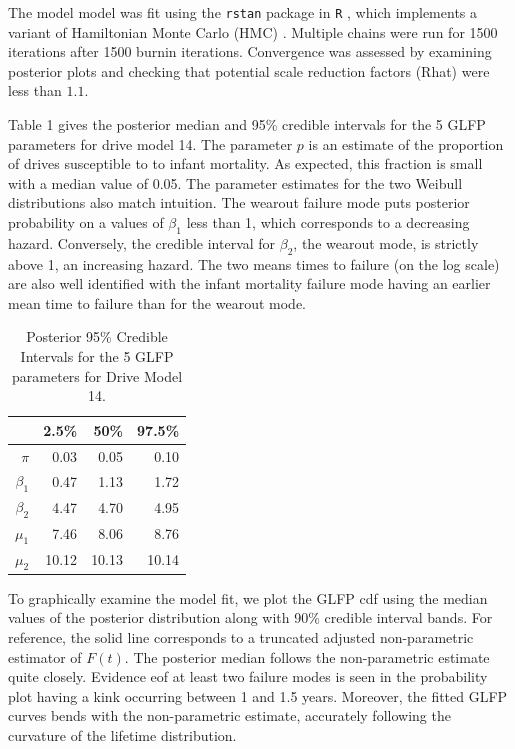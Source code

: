 \documentclass[12pt]{article}
\begin{document}
The model model was fit using the {\tt rstan}\cite{rstan} package in {\tt R} \cite{r}, which implements a variant of Hamiltonian Monte Carlo (HMC) \cite{betancourt}. Multiple chains were run for 1500 iterations after 1500 burnin iterations. Convergence was assessed by examining posterior plots and checking that potential scale reduction factors (Rhat) \cite{gelman2014bayesian} were less than $1.1$.

Table 1 gives the posterior median and 95\% credible intervals for the 5 GLFP parameters for drive model 14.  The parameter $p$ is an estimate of the proportion of drives susceptible to to infant mortality.  As expected, this fraction is small with a median value of 0.05.  The parameter estimates for the two Weibull distributions also match intuition.  The wearout failure mode puts posterior probability on a values of $\beta_1$ less than 1, which corresponds to a decreasing hazard.  Conversely, the credible interval for $\beta_2$, the wearout mode, is strictly above 1, an increasing hazard.  The two means times to failure (on the log scale) are also well identified with the infant mortality failure mode having an earlier mean time to failure than for the wearout mode. 

\begin{table}[H]
\centering
\begin{tabular}{rrrr}
  \hline
 & 2.5\% & 50\% & 97.5\% \\ 
  \hline
$\pi$ & 0.03 & 0.05 & 0.10 \\ 
 $\beta_1$ & 0.47 & 1.13 & 1.72 \\ 
  $\beta_2$ & 4.47 & 4.70 & 4.95 \\ 
  $\mu_1$ & 7.46 & 8.06 & 8.76 \\ 
  $\mu_2$ & 10.12 & 10.13 & 10.14 \\ 
   \hline
\end{tabular}
\caption{Posterior 95\% Credible Intervals for the 5 GLFP parameters for Drive Model 14.}
\label{table:1}
\end{table}

To graphically examine the model fit, we plot the GLFP cdf using the median values of the posterior distribution along with 90\% credible interval bands.  For reference, the solid line corresponds to a truncated adjusted non-parametric  estimator of $F(t)$.  The posterior median follows the non-parametric estimate quite closely.  Evidence eof at least two failure modes is seen in the probability plot having a kink occurring between 1 and 1.5 years.  Moreover, the fitted GLFP curves bends with the non-parametric estimate, accurately following the curvature of the lifetime distribution.
\end{document}
